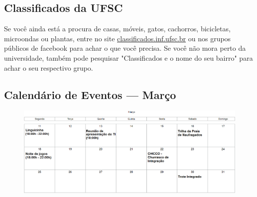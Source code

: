 \documentclass{article}
\begin{document}
\subsection{Classificados da UFSC}
Se você ainda está a procura de casas, móveis, gatos, cachorros, bicicletas, microondas ou plantas, entre no site \url{classificados.inf.ufsc.br}
ou nos grupos públicos de facebook para achar o que você precisa. Se você não mora perto da universidade, também pode pesquisar "Classificados e o nome do seu bairro"  para achar o seu respectivo grupo.

\clearpage

\thispagestyle{empty}
\begin{landscape}
    \section{Calendário de Eventos --- Março}
    \vspace{2em}
    \begin{figure}[ht]
        \centering
        \includegraphics[width=1.3\paperwidth,height=1.3\paperheight,keepaspectratio]{calendario}
    \end{figure}
\end{landscape}
\restoregeometry

\thispagestyle{empty}
\end{document}
